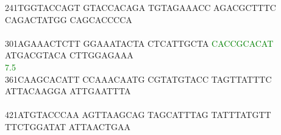 \documentclass[11pt,twoside,reqno,a4paper]{article}
\begin{document}
{241\hspace*{1\charwidth}TGGTACCAGT	GTACCACAGA	TGTAGAAACC	AGACGCTTTC	CAGACTATGG	CAGCACCCCA	\\
\hspace*{4\charwidth}\hspace*{1\charwidth}\hspace*{1\charwidth}\hspace*{1\charwidth}\hspace*{1\charwidth}\hspace*{1\charwidth}\hspace*{1\charwidth}\\
301\hspace*{1\charwidth}AGAAACTCTT	GGAAATACTA	CTCATTGCTA	\textcolor{Green}{C}\textcolor{Green}{A}\textcolor{Green}{C}\textcolor{Green}{C}\textcolor{Green}{G}\textcolor{Green}{C}\textcolor{Green}{A}\textcolor{Green}{C}\textcolor{Green}{A}\textcolor{Green}{T}	ATGACGTACA	CTTGGAGAAA	\\
\hspace*{4\charwidth}\hspace*{1\charwidth}\hspace*{1\charwidth}\hspace*{1\charwidth}\hspace*{30\charwidth}\textcolor{Green}{7.5}\hspace*{1\charwidth}\hspace*{1\charwidth}\hspace*{1\charwidth}\\
361\hspace*{1\charwidth}CAAGCACATT	CCAAACAATG	CGTATGTACC	TAGTTATTTC	ATTACAAGGA	ATTGAATTTA	\\
\hspace*{4\charwidth}\hspace*{1\charwidth}\hspace*{1\charwidth}\hspace*{1\charwidth}\hspace*{1\charwidth}\hspace*{1\charwidth}\hspace*{1\charwidth}\\
421\hspace*{1\charwidth}ATGTACCCAA	AGTTAAGCAG	TAGCATTTAG	TATTTATGTT	TTCTGGATAT	ATTAACTGAA	\\
\hspace*{4\charwidth}\hspace*{1\charwidth}\hspace*{1\charwidth}\hspace*{1\charwidth}\hspace*{1\charwidth}\hspace*{1\charwidth}\hspace*{1\charwidth}\\
}
\end{document}
